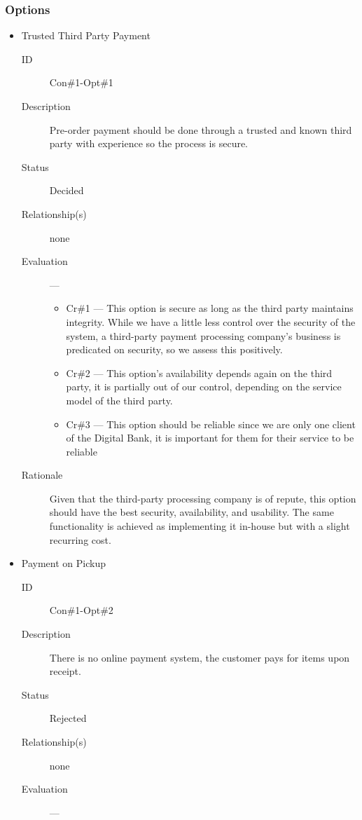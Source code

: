 \documentclass[11pt]{article}
\begin{document}
\subsubsection*{Options}
\label{sec:org2895559}
\begin{itemize}
\item Trusted Third Party Payment
\label{sec:org3e5b13d}
\begin{description}
\item[{ID}] Con\#1-Opt\#1
\item[{Description}] Pre-order payment should be done through a
trusted and known third party with experience so
the process is secure.
\item[{Status}] Decided
\item[{Relationship(s)}] none
\item[{Evaluation}] ---
\begin{itemize}
\item Cr\#1 --- This option is secure as long as the
third party maintains integrity. While we have a little less
control over the security of the system, a third-party
payment processing company's business is predicated on
security, so we assess this positively.
\item Cr\#2 --- This option's availability depends again on the
third party, it is partially out of our control, depending on
the service model of the third party.
\item Cr\#3 --- This option should be reliable since we are only one
client of the Digital Bank, it is important for
them for their service to be reliable
\end{itemize}
\item[{Rationale}] Given that the third-party processing company is
of repute, this option should have the best
security, availability, and usability. The same
functionality is achieved as implementing it
in-house but with a slight recurring cost.
\end{description}
\item Payment on Pickup
\label{sec:org246284c}
\begin{description}
\item[{ID}] Con\#1-Opt\#2
\item[{Description}] There is no online payment system, the customer
pays for items upon receipt.
\item[{Status}] Rejected
\item[{Relationship(s)}] none
\item[{Evaluation}] ---
\begin{itemize}

\end{itemize}
\end{description}
\end{itemize}
\end{document}
